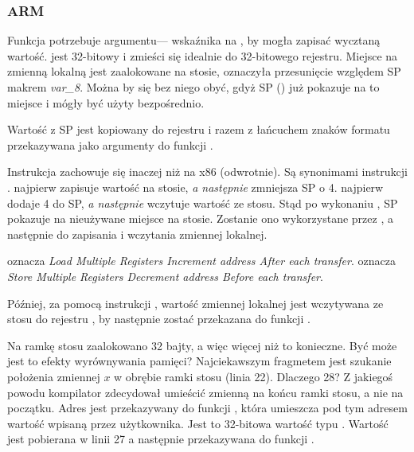 \subsubsection{ARM}

\myparagraph{\OptimizingKeilVI (\ThumbMode)}



\myindex{\CLanguageElements!\Pointers}

Funkcja \scanf potrzebuje argumentu--- wskaźnika na \Tint, by mogła zapisać wycztaną wartość.
\Tint jest 32-bitowy i zmieści się idealnie do 32-bitowego rejestru.
Miejsce na zmienną lokalną  jest zaalokowane na stosie, \IDA
oznaczyła przesunięcie względem \ac{SP} makrem \emph{var\_8}. Można by się bez niego obyć, gdyż \ac{SP} () już pokazuje na to miejsce i mógły być użyty bezpośrednio.

Wartość z \ac{SP} jest kopiowany do rejestru  i razem z łańcuchem znaków formatu przekazywana jako argumenty do funkcji \scanf.

Instrukcja  zachowuje się inaczej niż na x86 (odwrotnie).
Są synonimami instrukcji \\ .
 najpierw zapisuje wartość na stosie, \emph{a następnie} zmniejsza \ac{SP} o 4.
 najpierw dodaje 4 do \ac{SP}, \emph{a następnie} wczytuje wartość ze stosu.
Stąd po wykonaniu , \ac{SP} pokazuje na nieużywane miejsce na stosie.
Zostanie ono wykorzystane przez \scanf, a następnie \printf do zapisania i wczytania zmiennej lokalnej.

 oznacza \emph{Load Multiple Registers Increment address After each transfer}.
 oznacza \emph{Store Multiple Registers Decrement address Before each transfer}.

Później, za pomocą instrukcji , wartość zmiennej lokalnej jest wczytywana ze stosu do rejestru , by następnie zostać przekazana do funkcji \printf.




Na ramkę stosu zaalokowano 32 bajty, a więc więcej niż to konieczne. Być może jest to efekty wyrównywania pamięci?
Najciekawszym fragmetem jest szukanie położenia zmiennej $x$ w obrębie ramki stosu (linia 22).
Dlaczego 28? Z jakiegoś powodu kompilator zdecydował umieścić zmienną na końcu ramki stosu, a nie na początku.
Adres jest przekazywany do funkcji \scanf, która umieszcza pod tym adresem wartość wpisaną przez użytkownika.
Jest to 32-bitowa wartość typu \Tint.
Wartość jest pobierana w linii 27 a następnie przekazywana do funkcji \printf.

